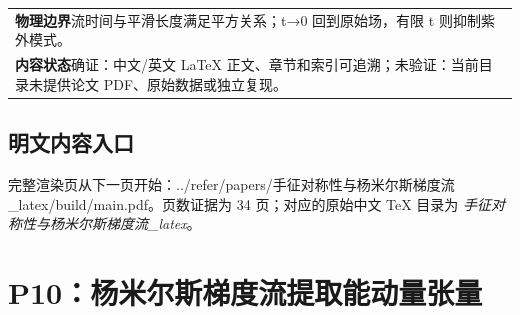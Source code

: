 \documentclass[UTF8,11pt,oneside]{ctexbook}
\begin{document}
\begin{table}[htbp]
\begin{tabular}{@{}p{}@{}}
    \textbf{物理边界}\quad 流时间与平滑长度满足平方关系；t→0 回到原始场，有限 t 则抑制紫外模式。 \\
    \textbf{内容状态}\quad 确证：中文/英文 LaTeX 正文、章节和索引可追溯；未验证：当前目录未提供论文 PDF、原始数据或独立复现。 \\
    \bottomrule
  \end{tabular}
\end{table}
\section*{明文内容入口}
\noindent 完整渲染页从下一页开始：../\allowbreak{}refer/\allowbreak{}papers/\allowbreak{}手征对称性与杨米尔斯梯度流\_\allowbreak{}latex/\allowbreak{}build/\allowbreak{}main.pdf。页数证据为 34 页；对应的原始中文 TeX 目录为 \emph{手征对称性与杨米尔斯梯度流\_latex}。
\clearpage

\clearpage

\chapter{P10：杨米尔斯梯度流提取能动量张量}
\end{document}
